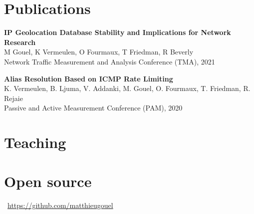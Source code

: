 \documentclass[11pt,a4paper,sans]{moderncv} %
\begin{document}

\section{Publications}

\textbf{IP Geolocation Database Stability and Implications for Network Research}\\
M Gouel, K Vermeulen, O Fourmaux, T Friedman, R Beverly\\
Network Traffic Measurement and Analysis Conference (TMA), 2021

\vspace{0.25cm}
\textbf{Alias Resolution Based on ICMP Rate Limiting}\\
K. Vermeulen, B. Ljuma, V. Addanki, M. Gouel, O. Fourmaux, T. Friedman, R. Rejaie\\
Passive and Active Measurement Conference (PAM), 2020


\section{Teaching}





\section{Open source}

\faGithub~\href{https://github.com/matthieugouel}{https://github.com/matthieugouel}
\vspace{+0.25cm}
\end{document}
